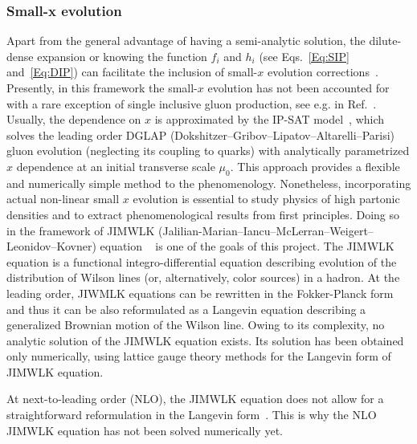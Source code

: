 \subsubsection*{Small-x evolution}
Apart from the general advantage of having a semi-analytic solution, 
the dilute-dense expansion or knowing the function $f_i$ and $h_i$ (see Eqs.~\eqref{Eq:SIP} and~\eqref{Eq:DIP}) 
can facilitate the inclusion of small-$x$ evolution corrections~\cite{Kuraev:1977fs,
Balitsky:1978ic, 
Balitsky:1997mk, 
Balitsky:1998ya, 
Kovchegov:1999yj,
Kovchegov:1999ua, 
JalilianMarian:1997dw, 
JalilianMarian:1997gr,
Iancu:2001ad, 
Iancu:2000hn}.
Presently, in this framework  the small-$x$ evolution has not been accounted for 
with a rare exception of single inclusive gluon production, see e.g. in Ref.~\cite{Dumitru:2018iko}. 
Usually, the dependence on $x$ is approximated by the IP-SAT model~\cite{Kowalski:2003hm,Rezaeian:2012ji},
which solves the leading order  DGLAP (Dokshitzer--Gribov--Lipatov--Altarelli--Parisi)  gluon evolution (neglecting its coupling to quarks) 
with analytically parametrized $x$ dependence at an initial 
transverse scale $\mu_0$. 
This approach provides a flexible and numerically simple method 
to the phenomenology. Nonetheless, incorporating actual non-linear 
small $x$ evolution is essential to study physics 
of high partonic densities and to extract phenomenological results from first principles.  
Doing so in the framework of JIMWLK (Jalilian-Marian--Iancu--McLerran--Weigert--Leonidov--Kovner) equation 
~\cite{JalilianMarian:1997dw, 
JalilianMarian:1997gr,
Iancu:2001ad, 
Iancu:2000hn} 
is one of the goals of this project. 
The JIMWLK equation is a functional integro-differential 
equation describing evolution of the distribution of Wilson lines (or, alternatively, color sources) in a 
hadron. At the leading order, JIWMLK equations can be rewritten in the Fokker-Planck form~\cite{Weigert:2000gi}
and thus it can be also reformulated as  a Langevin equation describing a generalized Brownian motion of 
the Wilson line. Owing to its complexity, no analytic solution of the JIMWLK equation exists. 
Its solution has been obtained only numerically, using lattice gauge theory methods for the
 Langevin form of JIMWLK equation.

 At next-to-leading order (NLO), the JIMWLK equation does not allow for a straightforward reformulation in the Langevin form~\cite{Kovner:2014lca,Balitsky:2013fea}. 
 This is why the NLO JIMWLK equation has not been solved numerically yet. 	




